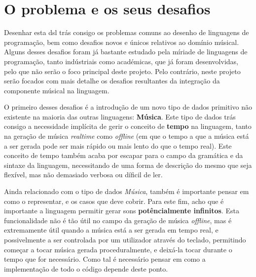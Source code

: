 \chapter{O problema e os seus desafios}
Desenhar esta \acrfull{dsl} trás consigo os problemas comuns ao desenho de linguagens de programação, bem como desafios novos e únicos relativos ao domínio músical. Alguns desses desafios foram já bastante estudado pela míriade de linguagens de programação, tanto indústriais como académicas, que já foram desenvolvidas, pelo que não serão o foco principal deste projeto. Pelo contrário, neste projeto serão focados com mais detalhe os desafios resultantes da integração da componente músical na linguagem.


O primeiro desses desafios é a introdução de um novo tipo de dados primitivo não existente na maioria das outras linguagens: \textbf{Música}. Este tipo de dados trás consigo a necessidade implícita de gerir o conceito de \textbf{tempo} na linguagem, tanto na geração de música \textit{realtime} como \textit{offline} (em que o tempo a que a música está a ser gerada pode ser mais rápido ou mais lento do que o tempo real). Este conceito de tempo também acaba por escapar para o campo da gramática e da sintaxe da linguagem, necessitando de uma forma de descrição do mesmo que seja flexível, mas não demasiado verbosa ou díficil de ler.

Ainda relacionado com o tipo de dados \textit{Música}, também é importante pensar em como o representar, e os casos que deve cobrir. Para este fim, acho que é importante a linguagem permitir gerar sons \textbf{potêncialmente infinitos}. Esta funcionalidade não é tão útil no campo da geração de música \textit{offline}, mas é extremamente útil quando a música está a ser gerada em tempo real, e possivelmente a ser controlada por um utilizador através do teclado, permitindo começar a tocar música gerada proceduralmente, e deixá-la tocar durante o tempo que for necessário. Como tal é necessário pensar em como a implementação de todo o código depende deste ponto.

